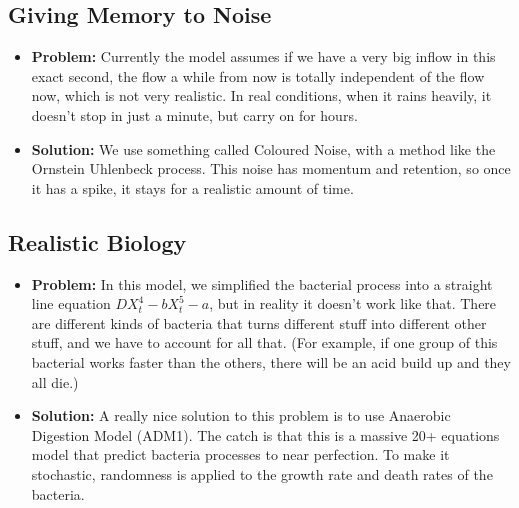 \documentclass[conference]{IEEEtran}
\renewcommand{\smallskip}{\vspace{0.5\baselineskip}}
\theoremstyle{definitionsc}
\theoremstyle{plainsc}
\theoremstyle{remarksc}
\begin{document}
\smallskip


\subsection{\textbf{Giving Memory to Noise}} 

\begin{itemize}
	\item\textbf{Problem:} Currently the model assumes if we have a very big inflow in this exact second, the flow a while from now is totally independent of the flow now, which is not very realistic. In real conditions, when it rains heavily, it doesn't stop in just a minute, but carry on for hours.
	
	\item\textbf{Solution:} We use something called Coloured Noise, with a method like the Ornstein Uhlenbeck process\cite{ornstein}. This noise has momentum and retention, so once it has a spike, it stays for a realistic amount of time.
	
\end{itemize}



\smallskip




\subsection{\textbf{Realistic Biology}}


\begin{itemize}
	\item \textbf{Problem:} In this model, we simplified the bacterial process into a straight line equation $DX^4_t - bX^5_t - a$, but in reality it doesn't work like that. There are different kinds of bacteria that turns different stuff into different other stuff, and we have to account for all that. (For example, if one group of this bacterial works faster than the others, there will be an acid build up and they all die.)

	\item \textbf{Solution:} A really nice solution to this problem is to use Anaerobic Digestion Model (ADM1)\cite{batstone2002}. The catch is that this is a massive 20+ equations model that predict bacteria processes to near perfection. To make it stochastic, randomness is applied to the growth rate and death rates of the bacteria.

\end{itemize}
\end{document}
